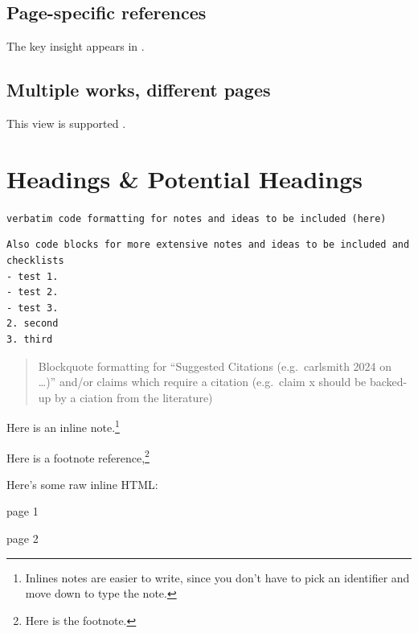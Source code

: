 \documentclass[
  11pt,
  letterpaper,
]{book}
\newenvironment{Shaded}{\begin{snugshade}}{\end{snugshade}}
\newcommand{\NormalTok}[1]{\textcolor[rgb]{0.00,0.23,0.31}{#1}}
\begin{document}
\subsection{Page-specific references}\label{page-specific-references}

The key insight appears in \autocite[45-67]{soares2014}.

\subsection{Multiple works, different
pages}\label{multiple-works-different-pages}

This view is supported \autocites[23]{soares2014}[156-159]{knuth1984}.

\section{Headings \& Potential Headings}\label{sec-heading}

\texttt{verbatim\ code\ formatting\ for\ notes\ and\ ideas\ to\ be\ included\ (here)}

\begin{verbatim}
Also code blocks for more extensive notes and ideas to be included and checklists
- test 1. 
- test 2. 
- test 3.
2. second
3. third
\end{verbatim}

\begin{quote}
Blockquote formatting for ``Suggested Citations (e.g.~carlsmith 2024 on
\ldots)'' and/or claims which require a citation (e.g.~claim x should be
backed-up by a ciation from the literature)
\end{quote}

Here is an inline note.\footnote{Inlines notes are easier to write,
  since you don't have to pick an identifier and move down to type the
  note.}

Here is a footnote reference,\footnote{Here is the footnote.}

\renewcommand*{\labelitemi}{\textgreater}

Here's some raw inline HTML:

\begin{Shaded}
\begin{Highlighting}[]
\NormalTok{page 1}



\NormalTok{page 2}
\end{Highlighting}
\end{Shaded}
\end{document}
